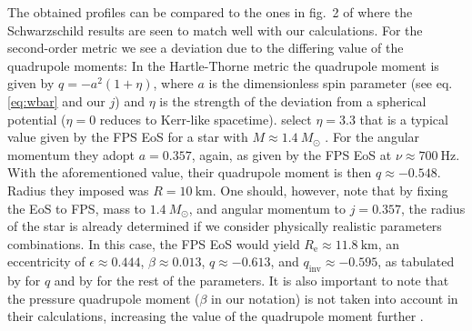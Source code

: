 \documentclass{aa}
\newcommand{\sch}{Schwarzschild }
\newcommand{\Msun}{\ensuremath{M_{\odot}}}
\newcommand{\qinv}{\ensuremath{q_{\mathrm{inv}}}}
\begin{document}
The obtained profiles can be compared to the ones in fig.~2 of \citet{BPO13} where the \sch results are seen to match well with our calculations.
For the second-order metric we see a deviation due to the differing value of the quadrupole moments:
In the Hartle-Thorne metric \citep{HT68} the quadrupole moment is given by $q = -a^2 (1 + \eta)$, where $a$ is the dimensionless spin parameter (see eq. \eqref{eq:wbar} and our $j$) and $\eta$ is the strength of the deviation from a spherical potential ($\eta = 0$ reduces to Kerr-like spacetime).
\citet{BPO13} select $\eta=3.3$ that is a typical value given by the FPS EoS \citep{FPS} for a star with $M\approx1.4~\Msun$ \citep[see][]{LP99}.
For the angular momentum they adopt $a = 0.357$, again, as given by the FPS EoS at $\nu \approx 700~\mathrm{Hz}$.
With the aforementioned value, their quadrupole moment is then $q \approx -0.548$.
Radius they imposed was $R = 10~\mathrm{km}$.
One should, however, note that by fixing the EoS to FPS, mass to $1.4~\Msun$, and angular momentum to $j=0.357$, the radius of the star is already determined if we consider physically realistic parameters combinations.
In this case, the FPS EoS would yield $R_{\mathrm{e}} \approx 11.8~\mathrm{km}$, an eccentricity of $\epsilon \approx 0.444$, $\beta \approx 0.013$, $q \approx -0.613$, and $\qinv \approx -0.595$, as tabulated by \citet{LP99} for $q$ and by \citet{CST94} for the rest of the parameters.
It is also important to note that the pressure quadrupole moment ($\beta$ in our notation) is not taken into account in their calculations, increasing the value of the quadrupole moment further \citep{PA12}.
\end{document}
